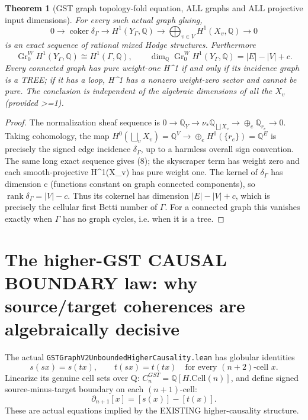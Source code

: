 \documentclass[11pt]{article}
\newcommand{\Q}{\mathbb Q}
\newcommand{\Gr}{\operatorname{Gr}}
\newtheorem{theorem}{Theorem}
\begin{document}
\begin{theorem}[GST graph topology-fold equation, ALL graphs and ALL projective input dimensions]
For every such actual graph gluing,
\[
 \boxed{
 0\longrightarrow\operatorname{coker}\delta_\Gamma
 \longrightarrow H^1(Y_\Gamma,\Q)
 \longrightarrow \bigoplus_{v\in V}H^1(X_v,\Q)
 \longrightarrow0
 }                                                        \tag{8}
\]
is an exact sequence of rational mixed Hodge structures.
Furthermore
\[
 \boxed{
 \Gr^W_0 H^1(Y_\Gamma,\Q)
   \cong H^1(\Gamma,\Q),\qquad
 \dim_\Q \Gr^W_0H^1(Y_\Gamma,\Q)
   =|E|-|V|+c.
 }                                                        \tag{9}
\]
Every connected graph has pure weight-one H^1
if and only if its incidence graph is a TREE;
if it has a loop, H^1 has a nonzero
weight-zero sector and cannot be pure.
The conclusion is independent of the algebraic
dimensions of all the \(X_v\) (provided >=1).
\end{theorem}
\begin{proof}
The normalization sheaf sequence is
\(0\to\Q_Y\to \nu_*\Q_{\bigsqcup X_v}
\to\oplus_e \Q_{r_e}\to0\).
Taking cohomology, the map
\(H^0(\bigsqcup_v X_v)=\Q^V
\to \oplus_eH^0(\{r_e\})=\Q^E\)
is precisely the signed edge incidence
\(\delta_\Gamma\), up to a harmless
overall sign convention.
The same long exact sequence gives (8);
the skyscraper term has weight zero and
each smooth-projective H^1(X_v) has
pure weight one.
The kernel of \(\delta_\Gamma\)
has dimension c (functions constant on
graph connected components), so
\(\operatorname{rank}\delta_\Gamma=|V|-c\).
Thus its cokernel has dimension
\(|E|-|V|+c\), which is precisely
the cellular first Betti number
of \(\Gamma\).
For a connected graph this vanishes
exactly when \(\Gamma\) has no graph
cycles, i.e. when it is a tree.
\end{proof}

\section{The higher-GST CAUSAL BOUNDARY law: why source/target coherences are algebraically decisive}
The actual
\texttt{GSTGraphV2UnboundedHigherCausality.lean}
has globular identities
\[
 s(sx)=s(tx),\qquad t(sx)=t(tx)
 \quad \text{for every \((n+2)\)-cell }x.
\]
Linearize its genuine cell sets over Q:
\(C_n^{GST}=\Q[H.\mathrm{Cell}(n)]\),
and define signed source-minus-target
boundary on each \((n+1)\)-cell:
\[
 \boxed{\partial_{n+1}[x]=[s(x)]-[t(x)].}          \tag{10}
\]
These are actual equations implied by the
EXISTING higher-causality structure.
\end{document}
